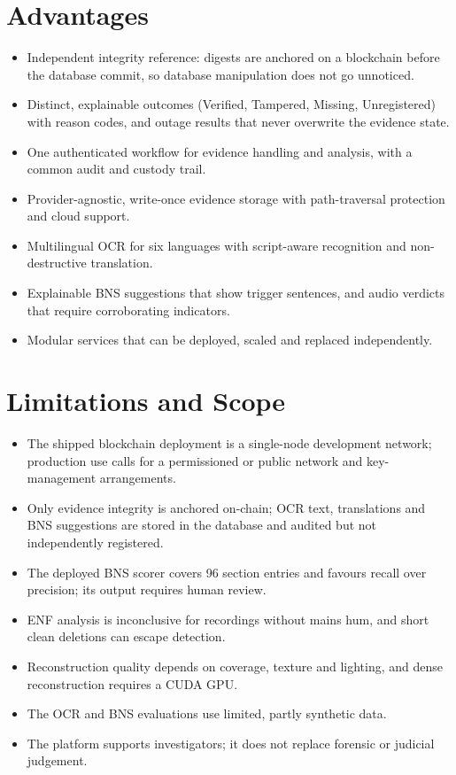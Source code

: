 \documentclass[12pt,a4paper,oneside]{report}
\begin{document}
\section{Advantages}
\begin{itemize}
  \item Independent integrity reference: digests are anchored on a blockchain before the database commit, so database manipulation does not go unnoticed.
  \item Distinct, explainable outcomes (Verified, Tampered, Missing, Unregistered) with reason codes, and outage results that never overwrite the evidence state.
  \item One authenticated workflow for evidence handling and analysis, with a common audit and custody trail.
  \item Provider-agnostic, write-once evidence storage with path-traversal protection and cloud support.
  \item Multilingual OCR for six languages with script-aware recognition and non-destructive translation.
  \item Explainable BNS suggestions that show trigger sentences, and audio verdicts that require corroborating indicators.
  \item Modular services that can be deployed, scaled and replaced independently.
\end{itemize}

\section{Limitations and Scope}
\begin{itemize}
  \item The shipped blockchain deployment is a single-node development network; production use calls for a permissioned or public network and key-management arrangements.
  \item Only evidence integrity is anchored on-chain; OCR text, translations and BNS suggestions are stored in the database and audited but not independently registered.
  \item The deployed BNS scorer covers 96 section entries and favours recall over precision; its output requires human review.
  \item ENF analysis is inconclusive for recordings without mains hum, and short clean deletions can escape detection.
  \item Reconstruction quality depends on coverage, texture and lighting, and dense reconstruction requires a CUDA GPU.
  \item The OCR and BNS evaluations use limited, partly synthetic data.
  \item The platform supports investigators; it does not replace forensic or judicial judgement.
\end{itemize}
\end{document}
